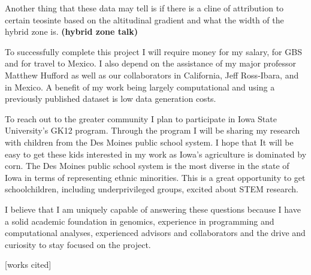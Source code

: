 \documentclass[12pt]{amsart}
\begin{document}
Another thing that these data may tell is if there is a cline of attribution to certain teosinte based on the altitudinal gradient and what the width of the hybrid zone is. \textbf{(hybrid zone talk)}

To successfully complete this project I will require money for my salary, for GBS and for travel to Mexico.  I also depend on the assistance of my major professor Matthew Hufford as well as our collaborators in California, Jeff Ross-Ibara, and in Mexico.
A benefit of my work being largely computational and using a previously published dataset is low data generation costs.

To reach out to the greater community I plan to participate in Iowa State University's GK12 program.  Through the program I will be sharing my research with children from the Des Moines public school system.  
I hope that It will be easy to get these kids interested in my work as Iowa's agriculture is dominated by corn.
The Des Moines public school system is the most diverse in the state of Iowa in terms of representing ethnic minorities.  This is a great opportunity to get schoolchildren, including underprivileged groups, excited about STEM research.  

I believe that I am uniquely capable of answering these questions because I have a solid academic foundation in genomics, experience in programming and computational analyses, experienced advisors and collaborators and the drive and curiosity to stay focused on the project.

\small
[works cited]
\end{document}
